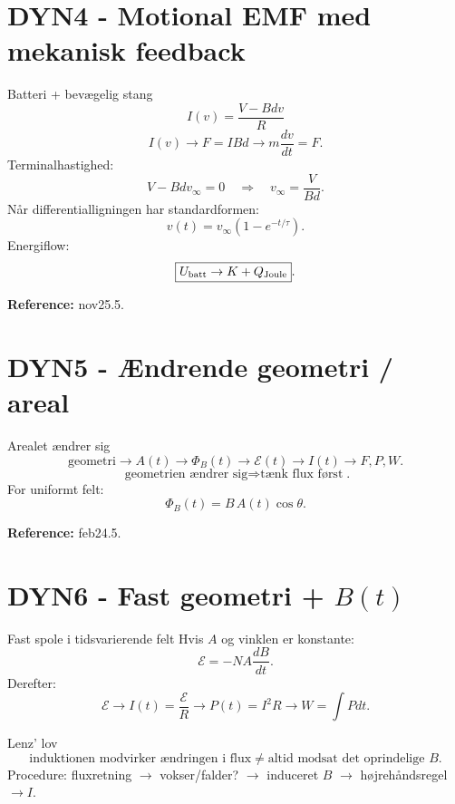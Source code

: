 \documentclass[10pt,a4paper]{article}
\begin{document}
\section*{DYN4 - Motional EMF med mekanisk feedback}
{}
\begin{casebox}{Batteri + bevægelig stang}
\[
\boxed{I(v)=\frac{V-Bdv}{R}}
\]
\[
I(v)\to F=IBd\to m\frac{dv}{dt}=F.
\]
Terminalhastighed:
\[
V-Bdv_\infty=0
\quad\Rightarrow\quad
\boxed{v_\infty=\frac{V}{Bd}}.
\]
Når differentialligningen har standardformen:
\[
\boxed{v(t)=v_\infty(1-e^{-t/\tau})}.
\]
Energiflow:
\[
\boxed{U_{\rm batt}\to K+Q_{\rm Joule}}.
\]
\end{casebox}
\textbf{Reference:} nov25.5.

\newpage
\section*{DYN5 - Ændrende geometri / areal}
{}
\begin{casebox}{Arealet ændrer sig}
\[
\boxed{\text{geometri}\to A(t)\to\Phi_B(t)\to\mathcal E(t)\to I(t)\to F,P,W}.
\]
\[
\boxed{\text{geometrien ændrer sig}\Rightarrow\text{tænk flux først}}.
\]
For uniformt felt:
\[
\Phi_B(t)=B\,A(t)\cos\theta.
\]
\end{casebox}
\textbf{Reference:} feb24.5.

\section*{DYN6 - Fast geometri + $B(t)$}
{}
\begin{casebox}{Fast spole i tidsvarierende felt}
Hvis $A$ og vinklen er konstante:
\[
\boxed{\mathcal E=-NA\frac{dB}{dt}}.
\]
Derefter:
\[
\boxed{\mathcal E\to I(t)=\frac{\mathcal E}{R}\to P(t)=I^2R\to W=\int Pdt}.
\]
\end{casebox}
\begin{quickbox}{Lenz' lov}
\[
\boxed{\text{induktionen modvirker ændringen i flux}}
\neq
\boxed{\text{altid modsat det oprindelige }B}.
\]
Procedure: fluxretning $\to$ vokser/falder? $\to$ induceret $B$ $\to$ højrehåndsregel $\to I$.
\end{quickbox}
\end{document}
